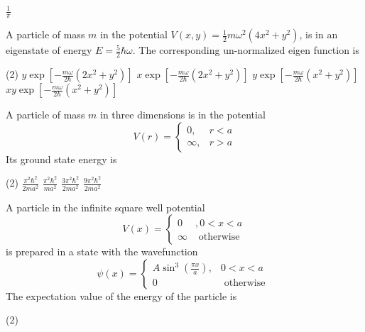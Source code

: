 \begin{enumerate}
\begin{tasks}
	\task[\textbf{D.}]$\frac{1}{\pi}$
\end{tasks}
\begin{minipage}{\textwidth}
	\item A particle of mass $m$ in the potential $V(x, y)=\frac{1}{2} m \omega^{2}\left(4 x^{2}+y^{2}\right)$, is in an eigenstate of energy $E=\frac{5}{2} \hbar \omega$. The corresponding un-normalized eigen function is
\end{minipage}
\begin{tasks}(2)
	\task[\textbf{A.}] $y \exp \left[-\frac{m \omega}{2 \hbar}\left(2 x^{2}+y^{2}\right)\right]$
	\task[\textbf{B.}]$x \exp \left[-\frac{m \omega}{2 \hbar}\left(2 x^{2}+y^{2}\right)\right]$
	\task[\textbf{C.}]$y \exp \left[-\frac{m \omega}{2 \hbar}\left(x^{2}+y^{2}\right)\right]$
	\task[\textbf{D.}]$x y \exp \left[-\frac{m \omega}{2 \hbar}\left(x^{2}+y^{2}\right)\right]$
\end{tasks}
\begin{minipage}{\textwidth}
	\item A particle of mass $m$ in three dimensions is in the potential
	$$
	V(r)= \begin{cases}0, & r<a \\ \infty, & r>a\end{cases}
	$$
	Its ground state energy is
\end{minipage}
\begin{tasks}(2)
	\task[\textbf{A.}] $\frac{\pi^{2} \hbar^{2}}{2 m a^{2}}$
	\task[\textbf{B.}]$\frac{\pi^{2} \hbar^{2}}{m a^{2}}$
	\task[\textbf{C.}]$\frac{3 \pi^{2} \hbar^{2}}{2 m a^{2}}$
	\task[\textbf{D.}]$\frac{9 \pi^{2} \hbar^{2}}{2 m a^{2}}$
\end{tasks}
\begin{minipage}{\textwidth}
	\item A particle in the infinite square well potential
	$$
	V(x)= \begin{cases}0 & , 0<x<a \\ \infty & \text { otherwise }\end{cases}
	$$
	is prepared in a state with the wavefunction
	$$
	\psi(x)= \begin{cases}A \sin ^{3}\left(\frac{\pi x}{a}\right), & 0<x<a \\ 0 & \text { otherwise }\end{cases}
	$$
	The expectation value of the energy of the particle is
\end{minipage}
\begin{tasks}(2)

\end{tasks}
\end{enumerate}
